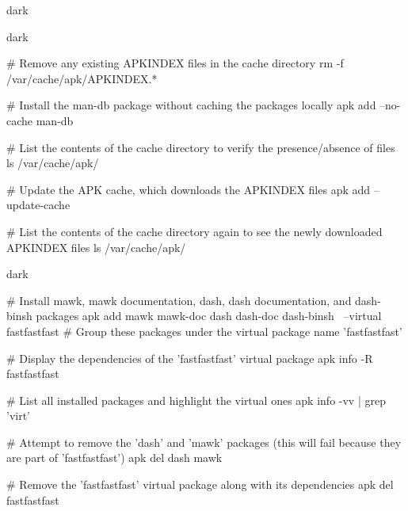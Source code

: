 \begin{baseBoxThree}{}{dark}
    \label{--no-cache and --update-cache}
    \begin{baseBoxThree}{}{dark}
        \begin{posnex}
# Remove any existing APKINDEX files in the cache directory
rm -f /var/cache/apk/APKINDEX.*

# Install the man-db package without caching the packages locally
apk add --no-cache man-db

# List the contents of the cache directory to verify the presence/absence of files
ls /var/cache/apk/

# Update the APK cache, which downloads the APKINDEX files
apk add --update-cache

# List the contents of the cache directory again to see the newly downloaded APKINDEX files
ls /var/cache/apk/
        \end{posnex}
        \smallskip
    \end{baseBoxThree}
    \smallskip
    \label{--virtual}
    \begin{baseBoxThree}{}{dark}
        \begin{posnex}
# Install mawk, mawk documentation, dash, dash documentation, and dash-binsh packages
apk add mawk mawk-doc dash dash-doc dash-binsh \
    --virtual fastfastfast  # Group these packages under the virtual package name 'fastfastfast'

# Display the dependencies of the 'fastfastfast' virtual package
apk info -R fastfastfast

# List all installed packages and highlight the virtual ones
apk info -vv | grep 'virt'

# Attempt to remove the 'dash' and 'mawk' packages (this will fail because they are part of 'fastfastfast')
apk del dash mawk

# Remove the 'fastfastfast' virtual package along with its dependencies
apk del fastfastfast
        \end{posnex}
    \end{baseBoxThree}
    \smallskip
\end{baseBoxThree}

